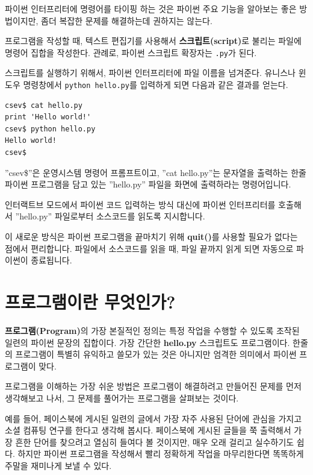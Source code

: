 파이썬 인터프리터에 명령어를 타이핑 하는 것은 파이썬 주요 기능을 알아보는 좋은 방법이지만,
좀더 복잡한 문제를 해결하는데 권하지는 않는다.

프로그램을 작성할 때, 
텍스트 편집기를 사용해서 {\bf 스크립트(script)}로 불리는 파일에 명령어 집합을 작성한다.
관례로, 파이썬 스크립트 확장자는 {\tt .py}가 된다. 


스크립트를 실행하기 위해서, 
파이썬 인터프리터에 파일 이름을 넘겨준다.
유니스나 윈도우 명령창에서 {\tt python hello.py}를 입력하게 되면 다음과 같은 결과를 얻는다.

\beforeverb
\begin{verbatim}
csev$ cat hello.py
print 'Hello world!'
csev$ python hello.py
Hello world!
csev$
\end{verbatim}
\afterverb
%

''csev\$''은 운영시스템 명령어 프롬프트이고, 
''cat hello.py''는 문자열을 출력하는 한줄 파이썬 프로그램을 담고 있는 ''hello.py'' 파일을 화면에 출력하라는 명령어입니다.

인터랙트브 모드에서 파이썬 코드 입력하는 방식 대신에 
파이썬 인터프리터를 호출해서 ''hello.py'' 파일로부터 소스코드를 읽도록 지시합니다.

이 새로운 방식은 파이썬 프로그램을 끝마치기 위해 {\bf quit()}를 사용할 필요가 없다는 점에서 편리합니다. 
파일에서 소스코드를 읽을 때, 파일 끝까지 읽게 되면 자동으로 파이썬이 종료됩니다.

\section{프로그램이란 무엇인가?}

{\bf 프로그램(Program)}의 가장 본질적인 정의는 
특정 작업을 수행할 수 있도록 조작된 일련의 파이썬 문장의 집합이다. 
가장 간단한 {\bf hello.py} 스크립트도 프로그램이다. 
한줄의 프로그램이 특별히 유익하고 쓸모가 있는 것은 아니지만 엄격한 의미에서 파이썬 프로그램이 맞다.

프로그램을 이해하는 가장 쉬운 방법은 프로그램이 해결하려고 만들어진 문제를 먼저 생각해보고 나서, 그 문제를 풀어가는 프로그램을 살펴보는 것이다.

예를 들어, 페이스북에 게시된 일련의 글에서 가장 자주 사용된 단어에 관심을 가지고 소셜 컴퓨팅 연구를 한다고 생각해 봅시다. 
페이스북에 게시된 글들을 쭉 출력해서 가장 흔한 단어를 찾으려고 열심히 들여다 볼 것이지만,
매우 오래 걸리고 실수하기도 쉽다. 
하지만 파이썬 프로그램을 작성해서 빨리 정확하게 작업을 마무리한다면 똑똑하게 주말을 재미나게 보낼 수 있다.

